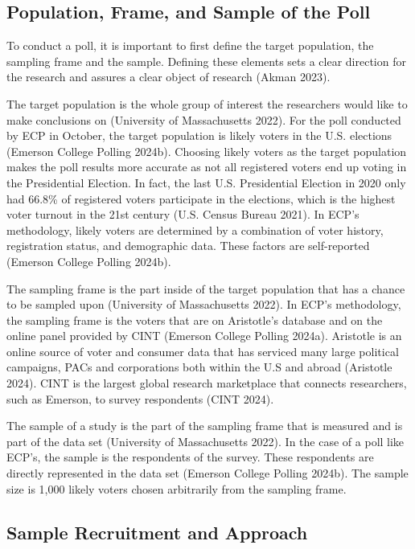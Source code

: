 \documentclass[
  letterpaper,
  DIV=11,
  numbers=noendperiod]{scrartcl}
\begin{document}
\hypertarget{population-frame-and-sample-of-the-poll}{%
\subsection{Population, Frame, and Sample of the
Poll}\label{population-frame-and-sample-of-the-poll}}

To conduct a poll, it is important to first define the target
population, the sampling frame and the sample. Defining these elements
sets a clear direction for the research and assures a clear object of
research (Akman 2023).

The target population is the whole group of interest the researchers
would like to make conclusions on (University of Massachusetts 2022).
For the poll conducted by ECP in October, the target population is
likely voters in the U.S. elections (Emerson College Polling 2024b).
Choosing likely voters as the target population makes the poll results
more accurate as not all registered voters end up voting in the
Presidential Election. In fact, the last U.S. Presidential Election in
2020 only had 66.8\% of registered voters participate in the elections,
which is the highest voter turnout in the 21st century (U.S. Census
Bureau 2021). In ECP's methodology, likely voters are determined by a
combination of voter history, registration status, and demographic data.
These factors are self-reported (Emerson College Polling 2024b).

The sampling frame is the part inside of the target population that has
a chance to be sampled upon (University of Massachusetts 2022). In ECP's
methodology, the sampling frame is the voters that are on Aristotle's
database and on the online panel provided by CINT (Emerson College
Polling 2024a). Aristotle is an online source of voter and consumer data
that has serviced many large political campaigns, PACs and corporations
both within the U.S and abroad (Aristotle 2024). CINT is the largest
global research marketplace that connects researchers, such as Emerson,
to survey respondents (CINT 2024).

The sample of a study is the part of the sampling frame that is measured
and is part of the data set (University of Massachusetts 2022). In the
case of a poll like ECP's, the sample is the respondents of the survey.
These respondents are directly represented in the data set (Emerson
College Polling 2024b). The sample size is 1,000 likely voters chosen
arbitrarily from the sampling frame.

\hypertarget{sample-recruitment-and-approach}{%
\subsection{Sample Recruitment and
Approach}\label{sample-recruitment-and-approach}}
\end{document}
